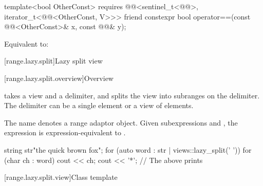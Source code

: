 %
\begin{itemdecl}
template<bool OtherConst>
  requires @@<sentinel_t<@@>, iterator_t<@@<OtherConst, V>>>
friend constexpr bool operator==(const @@<OtherConst>& x, const @@& y);
\end{itemdecl}

\begin{itemdescr}
\pnum
\effects
Equivalent to: 
\end{itemdescr}

[range.lazy.split]{Lazy split view}

[range.lazy.split.overview]{Overview}

\pnum
{} takes a view and a delimiter, and splits
the view into subranges on the delimiter. The delimiter can be
a single element or a view of elements.

\pnum
{}%
The name  denotes a
range adaptor object.
Given subexpressions  and ,
the expression  is expression-equivalent to
.

\pnum
\begin{example}
\begin{codeblock}
string str{"the quick brown fox"};
for (auto word : str | views::lazy_split(' ')) {
  for (char ch : word)
    cout << ch;
  cout << '*';
}
// The above prints 
\end{codeblock}
\end{example}

[range.lazy.split.view]{Class template }

